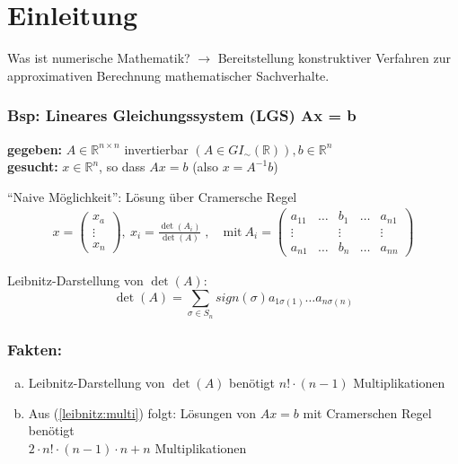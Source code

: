 \section{Einleitung}
Was ist numerische Mathematik?
$\rightarrow$ Bereitstellung konstruktiver Verfahren zur
approximativen Berechnung mathematischer Sachverhalte.

\subsubsection*{Bsp: Lineares Gleichungssystem (LGS) Ax = b}
\textbf{gegeben:} $A \in \mathbb{R}^{n \times n}$ invertierbar
$(A \in GI_{\sim} (\mathbb{R})), b \in \mathbb{R}^n$ \\
\textbf{gesucht:} $x \in \mathbb{R}^n$, so dass $Ax = b$ (also $x = A^{-1} b$)

"`Naive Möglichkeit"': Lösung über Cramersche Regel
\begin{align}
\label{cramer}
x = \begin{pmatrix} x_a \\ \vdots \\ x_n \end{pmatrix},
~ x_i = \frac{\det(A_i)}{\det (A)} \;, \quad
 \text{mit}~
A_i = \begin{pmatrix} a_{11} & \dots & b_1 & \dots & a_{n1}
\\ \vdots & & \vdots & & \vdots \\ a_{n1} & \dots & b_n &
\dots & a_{nn} \end{pmatrix}
\end{align}

Leibnitz-Darstellung von $\det(A)$:
\begin{displaymath}
\det(A) = \sum_{\sigma \in S_n} sign (\sigma) a_{1\sigma(1)}
\dots a_{n\sigma(n)}
\end{displaymath}

\subsubsection*{Fakten:}
\begin{enumerate}[(a)]
\item\label{leibnitz:multi}
Leibnitz-Darstellung von $\det(A)$ benötigt $n! \cdot (n-1)$ Multiplikationen
\item
Aus (\ref{leibnitz:multi}) folgt: Lösungen von $Ax=b$ mit Cramerschen Regel benötigt \\
$2 \cdot  n!\cdot(n-1) \cdot n + n$ Multiplikationen
\end{enumerate}

